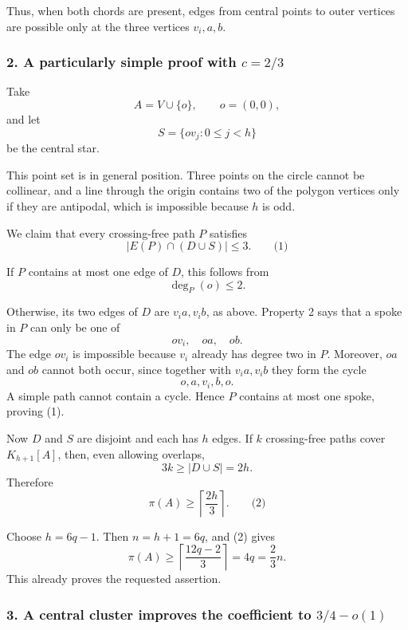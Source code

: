 \documentclass[
  11pt,
  a4paper,
]{article}
\begin{document}
Thus, when both chords are present, edges from central points to outer
vertices are possible only at the three vertices \(v_i,a,b\).

\subsubsection{\texorpdfstring{2. A particularly simple proof with
\(c=2/3\)}{2. A particularly simple proof with c=2/3}}\label{a-particularly-simple-proof-with-c23}

Take \[
A=V\cup\{o\},
\qquad o=(0,0),
\] and let \[
S=\{ov_j:0\le j<h\}
\] be the central star.

This point set is in general position. Three points on the circle cannot
be collinear, and a line through the origin contains two of the polygon
vertices only if they are antipodal, which is impossible because \(h\)
is odd.

We claim that every crossing-free path \(P\) satisfies \[
|E(P)\cap(D\cup S)|\le 3. \qquad\text{(1)}
\]

If \(P\) contains at most one edge of \(D\), this follows from \[
\deg_P(o)\le 2.
\]

Otherwise, its two edges of \(D\) are \(v_i a,v_i b\), as above.
Property 2 says that a spoke in \(P\) can only be one of \[
ov_i,\quad oa,\quad ob.
\] The edge \(ov_i\) is impossible because \(v_i\) already has degree
two in \(P\). Moreover, \(oa\) and \(ob\) cannot both occur, since
together with \(v_i a,v_i b\) they form the cycle \[
o,a,v_i,b,o.
\] A simple path cannot contain a cycle. Hence \(P\) contains at most
one spoke, proving (1).

Now \(D\) and \(S\) are disjoint and each has \(h\) edges. If \(k\)
crossing-free paths cover \(K_{h+1}[A]\), then, even allowing overlaps,
\[
3k\ge |D\cup S|=2h.
\] Therefore \[
\pi(A)\ge \left\lceil\frac{2h}{3}\right\rceil. \qquad\text{(2)}
\]

Choose \(h=6q-1\). Then \(n=h+1=6q\), and (2) gives \[
\pi(A)\ge
\left\lceil\frac{12q-2}{3}\right\rceil
=4q
=\frac23n.
\] This already proves the requested assertion.

\subsubsection{\texorpdfstring{3. A central cluster improves the
coefficient to
\(3/4-o(1)\)}{3. A central cluster improves the coefficient to 3/4-o(1)}}\label{a-central-cluster-improves-the-coefficient-to-34-o1}
\end{document}
